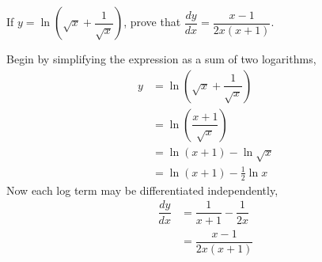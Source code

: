 

\question[4] If $y=\ln \left(\sqrt{x}+\dfrac{1}{\sqrt{x}}\right)$, 
prove that $\dfrac{dy}{dx}=\dfrac{x-1}{2x(x+1)}$.

\begin{solution}[\halfpage]
  Begin by simplifying the expression as a sum of two logarithms,
  \begin{align}
    y&=\ln \left(\sqrt{x}+\dfrac{1}{\sqrt{x}}\right) \\
     &=\ln \left(\dfrac{x+1}{\sqrt{x}}\right) \\
     &=\ln (x+1) -\ln \sqrt{x} \\
     &=\ln (x+1) -\frac{1}{2}\ln x
  \end{align}
  Now each log term may be differentiated independently,
  \begin{align}
    \dfrac{dy}{dx}&=\dfrac{1}{x+1}-\dfrac{1}{2x} \\
                  &=\dfrac{x-1}{2x(x+1)}
  \end{align}
\end{solution}

